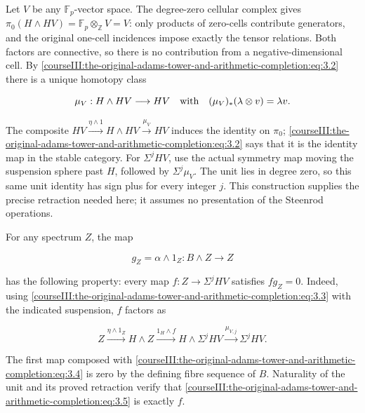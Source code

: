 Let \(V\) be any \(\mathbb F_p\)-vector space. The degree-zero cellular complex gives
\(\pi_0(H\wedge HV)=\mathbb F_p\otimes_{\mathbb Z}V=V\): only products of zero-cells contribute generators, and the original one-cell incidences impose exactly the tensor relations. Both factors are connective, so there is no contribution from a negative-dimensional cell. By \eqref{courseIII:the-original-adams-tower-and-arithmetic-completion:eq:3.2} there is a unique homotopy class

\begin{equation}
\mu_V:H\wedge HV\longrightarrow HV
\quad\hbox{with}\quad
(\mu_V)_*(\lambda\otimes v)=\lambda v.
\label{courseIII:the-original-adams-tower-and-arithmetic-completion:eq:3.3}
\end{equation}

The composite \(HV\xrightarrow{\eta\wedge1}H\wedge HV\xrightarrow{\mu_V}HV\) induces the identity on \(\pi_0\); \eqref{courseIII:the-original-adams-tower-and-arithmetic-completion:eq:3.2} says that it is the identity map in the stable category. For \(\Sigma^jHV\), use the actual symmetry map moving the suspension sphere past \(H\), followed by \(\Sigma^j\mu_V\). The unit lies in degree zero, so this same unit identity has sign plus for every integer \(j\). This construction supplies the precise retraction needed here; it assumes no presentation of the Steenrod operations.

For any spectrum \(Z\), the map

\begin{equation}
g_Z=\alpha\wedge1_Z:B\wedge Z\longrightarrow Z
\label{courseIII:the-original-adams-tower-and-arithmetic-completion:eq:3.4}
\end{equation}

has the following property: every map \(f:Z\to\Sigma^jHV\) satisfies \(fg_Z=0\). Indeed, using \eqref{courseIII:the-original-adams-tower-and-arithmetic-completion:eq:3.3} with the indicated suspension, \(f\) factors as

\begin{equation}
Z\xrightarrow{\eta\wedge1_Z}H\wedge Z
\xrightarrow{1_H\wedge f}H\wedge\Sigma^jHV
\xrightarrow{\mu_{V,j}}\Sigma^jHV.
\label{courseIII:the-original-adams-tower-and-arithmetic-completion:eq:3.5}
\end{equation}

The first map composed with \eqref{courseIII:the-original-adams-tower-and-arithmetic-completion:eq:3.4} is zero by the defining fibre sequence of \(B\). Naturality of the unit and its proved retraction verify that \eqref{courseIII:the-original-adams-tower-and-arithmetic-completion:eq:3.5} is exactly \(f\).

